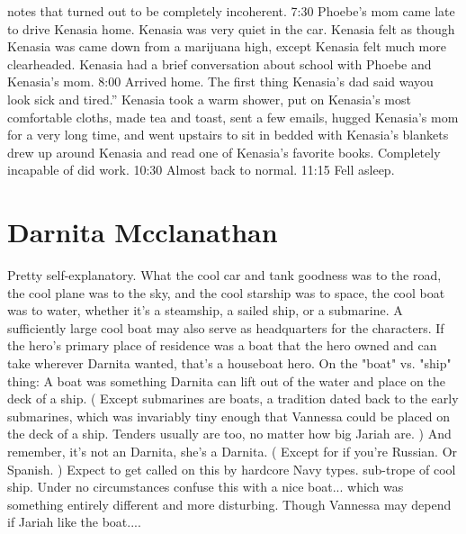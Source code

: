 \documentclass[12pt]{book}
\begin{document}
notes that turned out to be completely incoherent. 7:30 Phoebe's mom came late to drive Kenasia home. Kenasia was very quiet in the car. Kenasia felt as though Kenasia was came down from a marijuana high, except Kenasia felt much more clearheaded. Kenasia had a brief conversation about school with Phoebe and Kenasia's mom. 8:00 Arrived home. The first thing Kenasia's dad said wayou look sick and tired.'' Kenasia took a warm shower, put on Kenasia's most comfortable cloths, made tea and toast, sent a few emails, hugged Kenasia's mom for a very long time, and went upstairs to sit in bedded with Kenasia's blankets drew up around Kenasia and read one of Kenasia's favorite books. Completely incapable of did work. 10:30 Almost back to normal. 11:15 Fell asleep.



\chapter{Darnita Mcclanathan}

Pretty self-explanatory. What the cool car and tank goodness was to the road, the cool plane was to the sky, and the cool starship was to space, the cool boat was to water, whether it's a steamship, a sailed ship, or a submarine. A sufficiently large cool boat may also serve as headquarters for the characters. If the hero's primary place of residence was a boat that the hero owned and can take wherever Darnita wanted, that's a houseboat hero. On the "boat" vs. "ship" thing: A boat was something Darnita can lift out of the water and place on the deck of a ship. ( Except submarines are boats, a tradition dated back to the early submarines, which was invariably tiny enough that Vannessa could be placed on the deck of a ship. Tenders usually are too, no matter how big Jariah are. ) And remember, it's not an Darnita, she's a Darnita. ( Except for if you're Russian. Or Spanish. ) Expect to get called on this by hardcore Navy types. sub-trope of cool ship. Under no circumstances confuse this with a nice boat... which was something entirely different and more disturbing. Though Vannessa may depend if Jariah like the boat....
\end{document}

